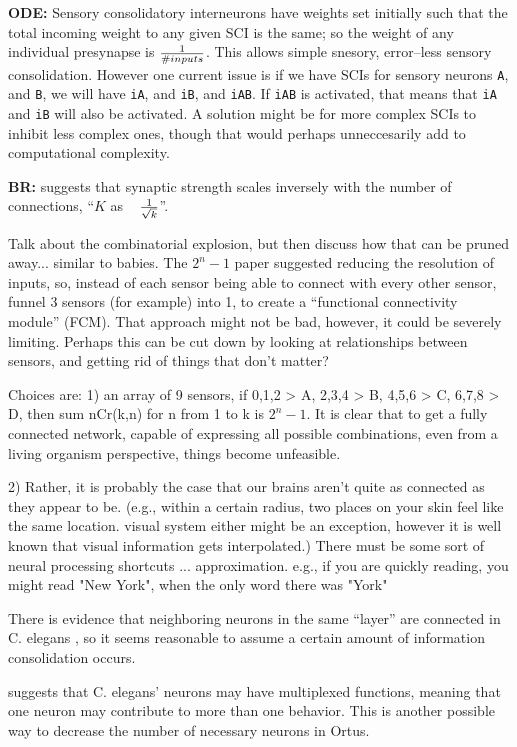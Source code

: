 \documentclass[letterpaper]{article}
\begin{document}
\textbf{ODE:} Sensory consolidatory interneurons have weights set initially such that the total incoming weight to any given SCI is the same; so the weight of any individual presynapse is $ 1 \over {\#inputs}$. This allows simple snesory, error--less sensory consolidation. However one current issue is if we have SCIs for sensory neurons \texttt{A}, and \texttt{B}, we will have \texttt{iA}, and \texttt{iB}, and \texttt{iAB}. If \texttt{iAB} is activated, that means that \texttt{iA} and \texttt{iB} will also be activated. A solution might be for more complex SCIs to inhibit less complex ones, though that would perhaps unneccesarily add to computational complexity.


\textbf{BR:} \citet{Barral2016} suggests that synaptic strength scales inversely with the number of connections, ``$K$ as ~ $1 \over \sqrt{k}$''. 


Talk about the combinatorial explosion, but then discuss how that can be pruned away... similar to babies. The $2^n - 1$ paper suggested reducing the resolution of inputs, so, instead of each sensor being able to connect with every other sensor, funnel 3 sensors (for example) into 1, to create a ``functional connectivity module'' (FCM). That approach might not be bad, however, it could be severely limiting. Perhaps this can be cut down by looking at relationships between sensors, and getting rid of things that don't matter?

Choices are:
1) an array of 9 sensors, if 0,1,2 > A, 2,3,4 > B, 4,5,6 > C, 6,7,8 > D, then sum {nCr(k,n)} for n from 1 to k is $2^n - 1$. It is clear that to get a fully connected network, capable of expressing all possible combinations, even from a living organism perspective, things become unfeasible.

2) Rather, it is probably the case that our brains aren't quite as connected as they appear to be. (e.g., within a certain radius, two places on your skin feel like the same location. visual system either might be an exception, however it is well known that visual information gets interpolated.)
There must be some sort of neural processing shortcuts ... approximation. e.g., if you are quickly reading, you might read "New York", when the only word there was "York"

There is evidence that neighboring neurons in the same ``layer'' are connected in C. elegans \citep{Azulay2016}, so it seems reasonable to assume a certain amount of information consolidation occurs.


\citet{Schroter2017} suggests that C. elegans' neurons may have multiplexed functions, meaning that one neuron may contribute to more than one behavior. This is another possible way to decrease the number of necessary neurons in Ortus.
\end{document}
